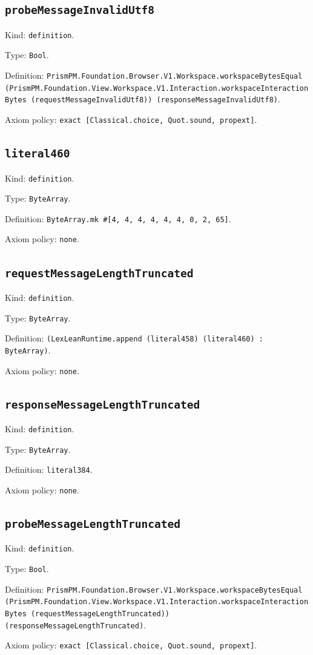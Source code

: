 \documentclass[11pt]{article}
\begin{document}
\subsection*{\texttt{probeMessageInvalidUtf8}}
\noindent Kind: \texttt{definition}.\par
\noindent Type: \texttt{Bool}.\par
\noindent Definition: \texttt{PrismPM.Foundation.Browser.V1.Workspace.workspaceBytesEqual (PrismPM.Foundation.View.Workspace.V1.Interaction.workspaceInteractionBytes (requestMessageInvalidUtf8)) (responseMessageInvalidUtf8)}.\par
\noindent Axiom policy: \texttt{exact [Classical.choice, Quot.sound, propext]}.\par
\subsection*{\texttt{literal460}}
\noindent Kind: \texttt{definition}.\par
\noindent Type: \texttt{ByteArray}.\par
\noindent Definition: \texttt{ByteArray.mk \#[4, 4, 4, 4, 4, 4, 0, 2, 65]}.\par
\noindent Axiom policy: \texttt{none}.\par
\subsection*{\texttt{requestMessageLengthTruncated}}
\noindent Kind: \texttt{definition}.\par
\noindent Type: \texttt{ByteArray}.\par
\noindent Definition: \texttt{(LexLeanRuntime.append (literal458) (literal460) : ByteArray)}.\par
\noindent Axiom policy: \texttt{none}.\par
\subsection*{\texttt{responseMessageLengthTruncated}}
\noindent Kind: \texttt{definition}.\par
\noindent Type: \texttt{ByteArray}.\par
\noindent Definition: \texttt{literal384}.\par
\noindent Axiom policy: \texttt{none}.\par
\subsection*{\texttt{probeMessageLengthTruncated}}
\noindent Kind: \texttt{definition}.\par
\noindent Type: \texttt{Bool}.\par
\noindent Definition: \texttt{PrismPM.Foundation.Browser.V1.Workspace.workspaceBytesEqual (PrismPM.Foundation.View.Workspace.V1.Interaction.workspaceInteractionBytes (requestMessageLengthTruncated)) (responseMessageLengthTruncated)}.\par
\noindent Axiom policy: \texttt{exact [Classical.choice, Quot.sound, propext]}.\par
\end{document}
